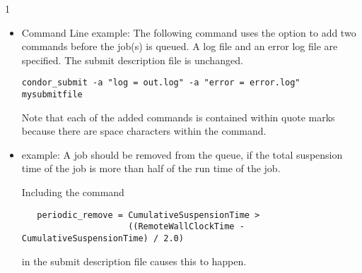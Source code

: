 \begin{ManPage}{\label{man-condor-submit}}{1}
\begin{itemize}
\footnotesize
\begin{verbatim}
      ####################                                                    
      #                                                                       
      # Example 3: Run on a RedHat 6 machine
      #                                                                       
      ####################                                                    
      Universe     = vanilla
      Executable   = /bin/sleep
      Arguments    = 30
      Requirements = (OpSysAndVer == "RedHat6")
                                                                          
      Error   = err.$(Process)                                                
      Input   = in.$(Process)                                                 
      Output  = out.$(Process)                                                
      Log     = sleep.log                                                                       
      Queue
\end{verbatim}
\normalsize



\item{Command Line example:} The following command uses the
 option to add two commands before the job(s) is queued.
A log file and an error log file are specified.
The submit description file is unchanged.
\footnotesize
\begin{verbatim}
condor_submit -a "log = out.log" -a "error = error.log" mysubmitfile
\end{verbatim}
\normalsize
Note that each of the added commands is contained within quote marks
because there are space characters within the command.

\item{ example:}
A job should be removed from the queue,
if the total suspension time of the job
is more than half of the run time of the job.

Including the command
\footnotesize
\begin{verbatim}
   periodic_remove = CumulativeSuspensionTime > 
                     ((RemoteWallClockTime - CumulativeSuspensionTime) / 2.0)
\end{verbatim}
\normalsize
in the submit description file causes this to happen.

\end{itemize} 


\GenRem
\begin{itemize}


\end{itemize}
\end{ManPage}
